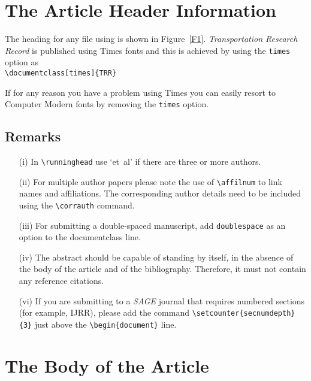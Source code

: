 \documentclass[times]{TRR}
\begin{document}
\section{The Article Header Information}
The heading for any file using \textsf{\journalclass} is shown in
Figure~\ref{F1}.  \textit{Transportation Research Record} is published using Times fonts and this is
achieved by using the \verb"times"
option as\\
\verb"\documentclass[times]{TRR}"

\noindent If for any reason you have a problem using Times you can
easily resort to Computer Modern fonts by removing the
\verb"times" option.

\subsection{Remarks}
\begin{enumerate}
\item[(i)] In \verb"\runninghead" use `{et~al}' if there
are three or more authors.

\item[(ii)] For multiple author papers please note the use of \verb"\affilnum" to
link names and affiliations. The corresponding author details need to be included using the
\verb+\corrauth+ command.

\item[(iii)] For submitting a double-spaced manuscript, add
\verb"doublespace" as an option to the documentclass line.

\item[(iv)] The abstract should be capable of standing by itself,
in the absence of the body of the article and of the bibliography.
Therefore, it must not contain any reference citations.


\item[(vi)] If you are submitting to a \textit{SAGE} journal that requires numbered sections (for example, IJRR), please add the command
  \verb+\setcounter{secnumdepth}{3}+ just above the \verb+\begin{document}+ line.

\end{enumerate}


\section{The Body of the Article}
\end{document}
